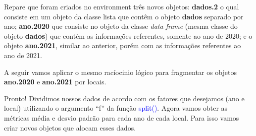 \documentclass[14pt,titlepage, oneside, openany, a4paper]{book}
\newenvironment{Shaded}{\begin{snugshade}}{\end{snugshade}}
\newcommand{\DataTypeTok}[1]{\textcolor[rgb]{0.13,0.29,0.53}{#1}}
\newcommand{\FloatTok}[1]{\textcolor[rgb]{0.00,0.00,0.81}{#1}}
\newcommand{\KeywordTok}[1]{\textcolor[rgb]{0.13,0.29,0.53}{\textbf{#1}}}
\newcommand{\NormalTok}[1]{#1}
\newcommand{\OperatorTok}[1]{\textcolor[rgb]{0.81,0.36,0.00}{\textbf{#1}}}
\newcommand{\StringTok}[1]{\textcolor[rgb]{0.31,0.60,0.02}{#1}}
\begin{document}
Repare que foram criados no environment três novos objetos: \textbf{dados.2} o qual consiste em um objeto da classe lista que contêm o objeto \textbf{dados} separado por ano; \textbf{ano.2020} que consiste no objeto da classe \emph{data frame} (mesma classe do objeto \textbf{dados}) que contêm as informações referentes, somente ao ano de 2020; e o objeto \textbf{ano.2021}, similar ao anterior, porém com as informações referentes ao ano de 2021.

A seguir vamos aplicar o mesmo racíocinio lógico para fragmentar os objetos \textbf{ano.2020} e \textbf{ano.2021} por locais.

\begin{Shaded}
\end{Shaded}

Pronto! Dividimos nossos dados de acordo com os fatores que desejamos (ano e local) utilizando o argumento ``f'' da função \textcolor{blue}{split()}. Agora vamos obter as métricas média e desvio padrão para cada ano de cada local. Para isso vamos criar novos objetos que alocam esses dados.
\end{document}

